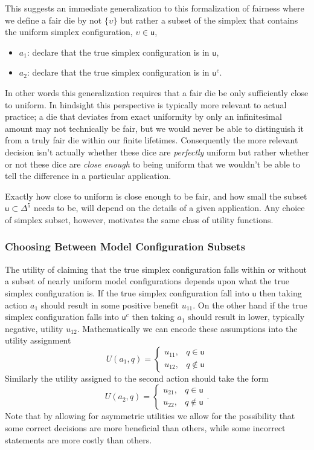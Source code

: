 \documentclass[
  letterpaper,
  DIV=11,
  numbers=noendperiod]{scrartcl}
\providecommand{\tightlist}{%
  \setlength{\itemsep}{0pt}\setlength{\parskip}{0pt}}\usepackage{longtable,booktabs,array}
\begin{document}
This suggests an immediate generalization to this formalization of
fairness where we define a fair die by not \(\{ \upsilon \}\) but rather
a subset of the simplex that contains the uniform simplex configuration,
\(\upsilon \in \mathsf{u}\),

\begin{itemize}
\tightlist
\item
  \(a_{1}\): declare that the true simplex configuration is in
  \(\mathsf{u}\),
\item
  \(a_{2}\): declare that the true simplex configuration is in
  \(\mathsf{u}^{c}\).
\end{itemize}

In other words this generalization requires that a fair die be only
sufficiently close to uniform. In hindsight this perspective is
typically more relevant to actual practice; a die that deviates from
exact uniformity by only an infinitesimal amount may not technically be
fair, but we would never be able to distinguish it from a truly fair die
within our finite lifetimes. Consequently the more relevant decision
isn't actually whether these dice are \emph{perfectly} uniform but
rather whether or not these dice are \emph{close enough} to being
uniform that we wouldn't be able to tell the difference in a particular
application.

Exactly how close to uniform is close enough to be fair, and how small
the subset \(\mathsf{u} \subset \Delta^{5}\) needs to be, will depend on
the details of a given application. Any choice of simplex subset,
however, motivates the same class of utility functions.

\subsubsection{Choosing Between Model Configuration
Subsets}\label{sec:decisions}

The utility of claiming that the true simplex configuration falls within
or without a subset of nearly uniform model configurations depends upon
what the true simplex configuration is. If the true simplex
configuration fall into \(\mathsf{u}\) then taking action \(a_{1}\)
should result in some positive benefit \(u_{11}\). On the other hand if
the true simplex configuration falls into \(\mathsf{u}^{c}\) then taking
\(a_{1}\) should result in lower, typically negative, utility
\(u_{12}\). Mathematically we can encode these assumptions into the
utility assignment \[
U(a_{1}, q)
=
\left\{
\begin{array}{rr}
u_{11}, & q \in \mathsf{u} \\
u_{12}, & q \notin \mathsf{u}
\end{array}
\right.
\] Similarly the utility assigned to the second action should take the
form \[
U(a_{2}, q)
=
\left\{
\begin{array}{rr}
u_{21}, & q \in \mathsf{u} \\
u_{22}, & q \notin \mathsf{u}
\end{array}
\right. .
\] Note that by allowing for asymmetric utilities we allow for the
possibility that some correct decisions are more beneficial than others,
while some incorrect statements are more costly than others.
\end{document}
